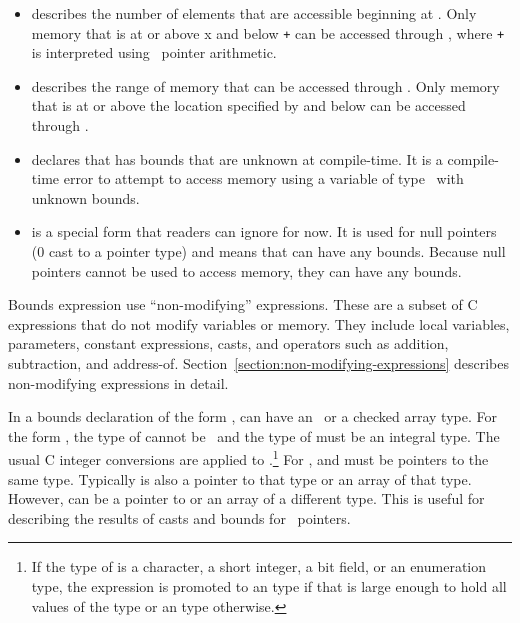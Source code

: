 \begin{itemize}
\item
   describes the number of
  elements that are accessible beginning at . Only memory that
  is at or above x and below  \texttt{+}  can be
  accessed through , where  \texttt{+}  is
  interpreted using \arrayptr\ pointer arithmetic.
\item
  describes the range of memory that can be accessed through .
  Only memory that is at or above the location specified by 
  and below  can be accessed through .
\item
   declares that  has bounds that
   are unknown at compile-time.
  It is a compile-time error to attempt to access memory using a
  variable of type \arrayptr\ with unknown bounds.
\item
   is a special form that readers can
  ignore for now. It is used for null pointers (0 cast to a pointer
  type) and means that  can have any bounds. Because null
  pointers cannot be used to access memory, they can have any bounds.
\end{itemize}

Bounds expression use ``non-modifying'' expressions. These are a subset
of C expressions that do not modify variables or memory. They include
local variables, parameters, constant expressions, casts, and operators
such as addition, subtraction, and address-of. 
Section~\ref{section:non-modifying-expressions}  describes
non-modifying expressions in detail.

In a bounds declaration of the form ,
 can have an \arrayptr\ or a checked array type.
For the form  ,  the type of
 cannot be \arrayptrvoid\ and the type of  must be an integral type.
The usual C integer conversions are applied to .\footnote{If the
type of  is a character, a short integer, a bit field, or an enumeration type,
the expression is promoted to an  type if that is large
enough to  hold all values of the type or an  type otherwise.}
For ,  and
 must be pointers to the same type.  Typically  is also 
a pointer to that type or an array of that type.  
However,  can be a pointer to or an array of a different type.
This is useful for describing the results of casts and
bounds for \arrayptrvoid\ pointers.

